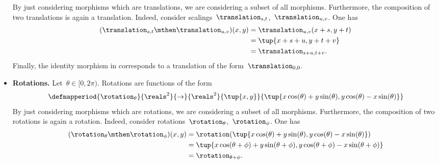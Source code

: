 \begin{solution}
\begin{itemize}
\begin{equation*}
              \end{equation*}
              By just considering morphisms which are translations, we are considering a subset of all morphisms.
              Furthermore, the composition of two translations is again a translation.
              Indeed, consider scalings~$\translation_{s,t}$,~$\translation_{u,v}$.
              One has
              \begin{equation*}
                  \begin{aligned}
                      (\translation_{s,t}\mthen \translation_{u,v})(x,y) & =\translation_{u,v}(x+s, y+t) \\
                                                                         & =\tup{x+s+u, y+t+v} \\
                                                                         & =\translation_{s+u,t+v}.
                  \end{aligned}
              \end{equation*}
              Finally, the identity morphism in \Draw corresponds to a translation of the form~$\translation_{0,0}$.
        \item \textbf{Rotations.}
              Let~$\theta \in [0,2\pi)$.
              Rotations are functions of the form
              \begin{equation*}
                  \defmapperiod{\rotation_{\theta}}{\reals^2}{\to}{\reals^2}{\tup{x,y}}{\tup{x\cos(\theta)+y\sin(\theta), y\cos(\theta)-x\sin(\theta)}}
              \end{equation*}
              By just considering morphisms which are rotations, we are considering a subset of all morphisms.
              Furthermore, the composition of two rotations is again a rotation.
              Indeed, consider rotations~$\rotation_{\theta}$,~$\rotation_{\phi}$.
              One has
              \begin{equation*}
                  \begin{aligned}
                      (\rotation_{\theta}\mthen \rotation_{\phi})(x,y) & =\rotation(\tup{x\cos(\theta)+y\sin(\theta), y\cos(\theta)-x\sin(\theta)}) \\
                                                                       & =\tup{x\cos(\theta+\phi)+y\sin(\theta+\phi), y\cos(\theta+\phi)-x\sin(\theta+\phi)} \\
                                                                       & =\rotation_{\theta+\phi}.
                  \end{aligned}

\end{equation*}
\end{itemize}
\end{solution}
